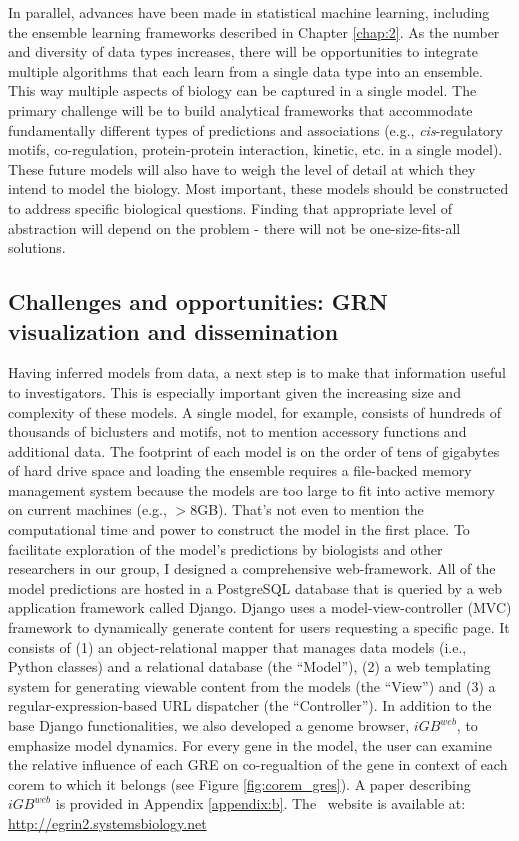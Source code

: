 In parallel, advances have been made in statistical machine learning, including the ensemble learning frameworks described in Chapter \ref{chap:2}. As the number and diversity of data types increases, there will be opportunities to integrate multiple algorithms that each learn from a single data type into an ensemble. This way multiple aspects of biology can be captured in a single model. The primary challenge will be to build analytical frameworks that accommodate fundamentally different types of predictions and associations (e.g., \textit{cis}-regulatory motifs, co-regulation, protein-protein interaction, kinetic, etc. in a single model). These future models will also have to weigh the level of detail at which they intend to model the biology. Most important, these models should be constructed to address specific biological questions. Finding that appropriate level of abstraction will depend on the problem - there will not be one-size-fits-all solutions.  

\subsection{Challenges and opportunities: GRN visualization and dissemination}

Having inferred models from data, a next step is to make that information useful to investigators. This is especially important given the increasing size and complexity of these models. A single \egrine model, for example, consists of hundreds of thousands of biclusters and motifs, not to mention accessory functions and additional data. The footprint of each model is on the order of tens of gigabytes of hard drive space and loading the ensemble requires a file-backed memory management system because the models are too large to fit into active memory on current machines (e.g., $>$8GB). That's not even to mention the computational time and power to construct the model in the first place. To facilitate exploration of the model's predictions by biologists and other researchers in our group, I designed a comprehensive web-framework. All of the model predictions are hosted in a PostgreSQL database that is queried by a web application framework called Django. Django uses a model-view-controller (MVC) framework to dynamically generate content for users requesting a specific page. It consists of (1) an object-relational mapper that manages data models (i.e., Python classes) and a relational database (the ``Model''), (2) a web templating system for generating viewable content from the models (the ``View'') and (3) a regular-expression-based URL dispatcher (the ``Controller''). In addition to the base Django functionalities, we also developed a genome browser, $iGB^{web}$, to emphasize model dynamics. For every gene in the model, the user can examine the relative influence of each GRE on co-regualtion of the gene in context of each corem to which it belongs (see Figure \ref{fig:corem_gres}). A paper describing $iGB^{web}$ is provided in Appendix \ref{appendix:b}. The \egrine\ website is available at: \href{http://egrin2.systemsbiology.net}{http://egrin2.systemsbiology.net}

